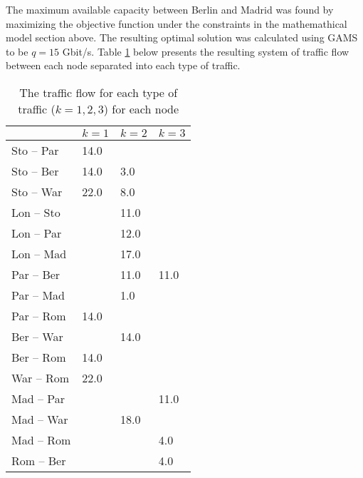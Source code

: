 The maximum available capacity between Berlin and Madrid was found by maximizing the objective function under the constraints in the mathemathical model section above. The resulting optimal solution was calculated using GAMS to be $q = 15$ Gbit/s. Table \ref{table:res2} below presents the resulting system of traffic flow between each node separated into each type of traffic. 

\begin{table}[H]
\centering
\caption{The traffic flow for each type of traffic ($k = 1,2,3$) for each node}
\label{table:res2}
\begin{tabular}{l|lll}
        & $k = 1$   & $k = 2$  & $k = 3$      \\ \hline
Sto -- Par & 14.0   &      &        \\
Sto -- Ber & 14.0   & 3.0  &        \\
Sto -- War & 22.0   & 8.0  &        \\
Lon -- Sto &        & 11.0 &        \\
Lon -- Par &        & 12.0 &        \\
Lon -- Mad &        & 17.0 &        \\
Par -- Ber &        & 11.0 & 11.0   \\
Par -- Mad &        & 1.0  &        \\
Par -- Rom & 14.0   &      &        \\
Ber -- War &        & 14.0 &        \\
Ber -- Rom & 14.0   &      &        \\
War -- Rom & 22.0   &      &        \\
Mad -- Par &        &      & 11.0   \\
Mad -- War &        & 18.0 &        \\
Mad -- Rom &        &      & 4.0    \\
Rom -- Ber &        &      & 4.0 
\end{tabular}
\end{table}